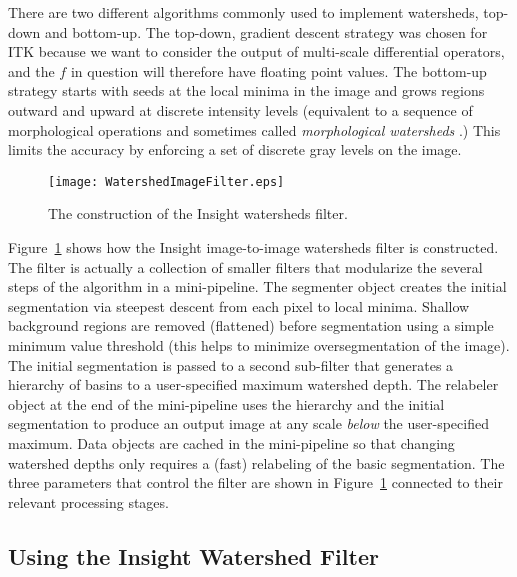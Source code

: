 There are two different algorithms commonly used to implement watersheds,
top-down and bottom-up.  The top-down, gradient descent strategy was chosen for
ITK because we want to consider the output of multi-scale differential
operators, and the $f$ in question will therefore have floating point
values. The bottom-up strategy starts with seeds at the local minima in the
image and grows regions outward and upward at discrete intensity levels
(equivalent to a sequence of morphological operations and sometimes called {\em
morphological watersheds} \cite{Serra1982}.) This limits the accuracy by
enforcing a set of discrete gray levels on the image.

\begin{figure}
\centering
\texttt{[image: WatershedImageFilter.eps]}
\caption{The construction of the Insight watersheds filter.}
\protect\label{fig:constructionWatersheds}
\end{figure}

Figure~\ref{fig:constructionWatersheds} shows how the Insight
image-to-image watersheds filter is constructed.  The filter is
actually a collection of smaller filters that modularize the several
steps of the algorithm in a mini-pipeline.  The segmenter object
creates the initial segmentation via steepest descent from each pixel
to local minima. Shallow background regions are removed (flattened)
before segmentation using a simple minimum value threshold (this helps
to minimize oversegmentation of the image).  The initial segmentation
is passed to a second sub-filter that generates a hierarchy of basins
to a user-specified maximum watershed depth.  The relabeler object at
the end of the mini-pipeline uses the hierarchy and the initial
segmentation to produce an output image at any scale {\em below} the
user-specified maximum.  Data objects are cached in the mini-pipeline
so that changing watershed depths only requires a (fast) relabeling of
the basic segmentation.  The three parameters that control the filter
are shown in Figure~\ref{fig:constructionWatersheds} connected to
their relevant processing stages.

\subsection{Using the Insight Watershed Filter}
\label{sec:UsingWatersheds}



